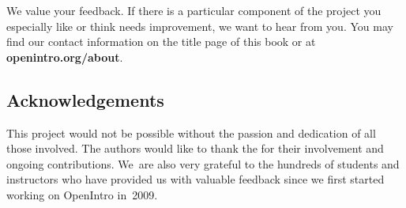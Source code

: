 We value your feedback.
If there is a particular component of the project you
especially like or think needs improvement,
we want to hear from you.
You may find our contact information on the title page
of this book or at
    {\color{black}\textbf{openintro.org/about}}.

\subsection*{Acknowledgements}

This project would not be possible without the passion
and dedication of all those involved.
The authors would like to thank the
for their involvement and ongoing contributions.
We~are also very grateful to the hundreds of students
and instructors who have provided us with valuable feedback
since we first started working on OpenIntro in~2009.
